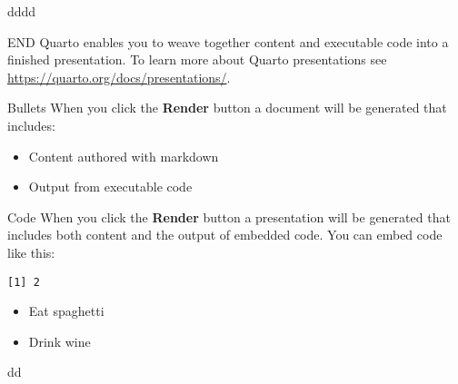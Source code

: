\documentclass[
  ignorenonframetext,
]{beamer}
\providecommand{\tightlist}{%
  \setlength{\itemsep}{0pt}\setlength{\parskip}{0pt}}\usepackage{longtable,booktabs,array}
\begin{document}
\begin{frame}{dddd}
\protect\hypertarget{dddd}{}
\begin{figure}

\begin{minipage}[t]{0.50\linewidth}

{\centering 

}

\end{minipage}%
%
\begin{minipage}[t]{0.50\linewidth}

{\centering 

}

\end{minipage}%
\newline
\begin{minipage}[t]{0.50\linewidth}

{\centering 

}

\end{minipage}%
%
\begin{minipage}[t]{0.50\linewidth}

{\centering 

}

\end{minipage}%

\end{figure}
\end{frame}

\begin{frame}{END}
\protect\hypertarget{end}{}
Quarto enables you to weave together content and executable code into a
finished presentation. To learn more about Quarto presentations see
\url{https://quarto.org/docs/presentations/}.
\end{frame}

\begin{frame}{Bullets}
\protect\hypertarget{bullets}{}
When you click the \textbf{Render} button a document will be generated
that includes:

\begin{itemize}
\tightlist
\item
  Content authored with markdown
\item
  Output from executable code
\end{itemize}
\end{frame}

\begin{frame}[fragile]{Code}
\protect\hypertarget{code}{}
When you click the \textbf{Render} button a presentation will be
generated that includes both content and the output of embedded code.
You can embed code like this:

\begin{verbatim}
[1] 2
\end{verbatim}

\begin{itemize}[<+->]
\tightlist
\item
  Eat spaghetti
\item
  Drink wine
\end{itemize}

dd
\end{frame}
\end{document}

